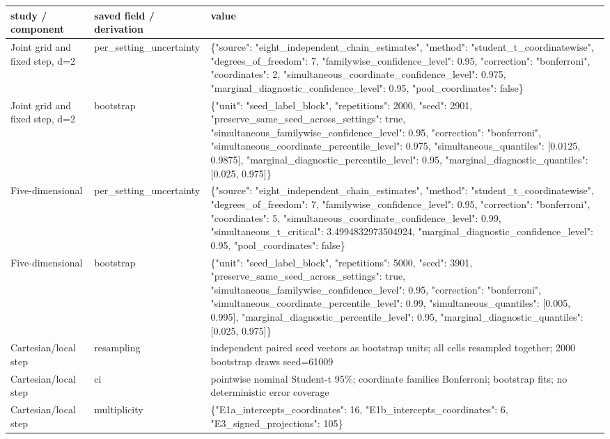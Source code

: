 \begin{tabular}{lll}
study / component & saved field / derivation & value \\
\hline
Joint grid and fixed step, d=2 & per\_setting\_uncertainty & \{"source": "eight\_independent\_chain\_estimates", "method": "student\_t\_coordinatewise", "degrees\_of\_freedom": 7, "familywise\_confidence\_level": 0.95, "correction": "bonferroni", "coordinates": 2, "simultaneous\_coordinate\_confidence\_level": 0.975, "marginal\_diagnostic\_confidence\_level": 0.95, "pool\_coordinates": false\} \\
Joint grid and fixed step, d=2 & bootstrap & \{"unit": "seed\_label\_block", "repetitions": 2000, "seed": 2901, "preserve\_same\_seed\_across\_settings": true, "simultaneous\_familywise\_confidence\_level": 0.95, "correction": "bonferroni", "simultaneous\_coordinate\_percentile\_level": 0.975, "simultaneous\_quantiles": [0.0125, 0.9875], "marginal\_diagnostic\_percentile\_level": 0.95, "marginal\_diagnostic\_quantiles": [0.025, 0.975]\} \\
Five-dimensional & per\_setting\_uncertainty & \{"source": "eight\_independent\_chain\_estimates", "method": "student\_t\_coordinatewise", "degrees\_of\_freedom": 7, "familywise\_confidence\_level": 0.95, "correction": "bonferroni", "coordinates": 5, "simultaneous\_coordinate\_confidence\_level": 0.99, "simultaneous\_t\_critical": 3.4994832973504924, "marginal\_diagnostic\_confidence\_level": 0.95, "pool\_coordinates": false\} \\
Five-dimensional & bootstrap & \{"unit": "seed\_label\_block", "repetitions": 5000, "seed": 3901, "preserve\_same\_seed\_across\_settings": true, "simultaneous\_familywise\_confidence\_level": 0.95, "correction": "bonferroni", "simultaneous\_coordinate\_percentile\_level": 0.99, "simultaneous\_quantiles": [0.005, 0.995], "marginal\_diagnostic\_percentile\_level": 0.95, "marginal\_diagnostic\_quantiles": [0.025, 0.975]\} \\
Cartesian/local step & resampling & independent paired seed vectors as bootstrap units; all cells resampled together; 2000 bootstrap draws seed=61009 \\
Cartesian/local step & ci & pointwise nominal Student-t 95\%; coordinate families Bonferroni; bootstrap fits; no deterministic error coverage \\
Cartesian/local step & multiplicity & \{"E1a\_intercepts\_coordinates": 16, "E1b\_intercepts\_coordinates": 6, "E3\_signed\_projections": 105\} \\

\end{tabular}
